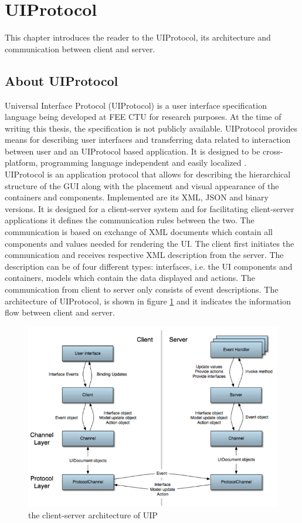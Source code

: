 \section{UIProtocol}
This chapter introduces the reader to the UIProtocol, its architecture and communication between client and server.

\subsection{About UIProtocol}
Universal Interface Protocol (UIProtocol) is a user interface specification language \cite{uip} being developed at FEE CTU for research purposes. At the time of writing this thesis, the specification is not publicly available. UIProtocol provides means for describing user interfaces and transferring data related to interaction between user and an UIProtocol based application. It is designed to be cross-platform, programming language independent and easily localized \cite{uip}.\\
UIProtocol is an application protocol that allows for describing the hierarchical structure of the GUI along with the placement and visual appearance of the containers and components. Implemented are its XML, JSON and binary versions. It is designed for a client-server system and for facilitating client-server applications it defines the communication rules between the two. The communication is based on exchange of XML documents which contain all components and values needed for rendering the UI. The client first initiates the communication and receives respective XML description from the server. The description can be of four different types: interfaces, i.e. the UI components and containers, models which contain the data displayed and actions. The communication from client to server only consists of event descriptions. The architecture of UIProtocol, is shown in figure \ref{fig:UIParchitecture} and it indicates the information flow between client and server.

\begin{figure}[ht!]
\centering
\includegraphics[width=135mm]{pics/UIParchitecture.png}
\caption{the client-server architecture of UIP}
\label{fig:UIParchitecture}
\end{figure}
\pagebreak

